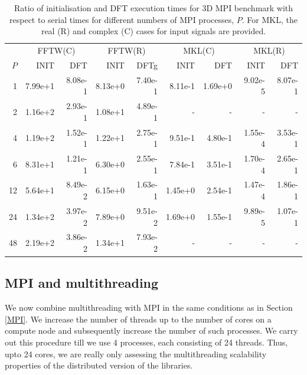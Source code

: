 \documentclass[12pt, a4paper]{article} \setlength{\textheight}{24cm}
\begin{document}
\begin{small}
\begin{table}[H]
  \centering
  \begin{tabular}{|r|rr|rr|rr|rr|}
    \hline
    & \multicolumn{2}{|c|}{FFTW(C)} & \multicolumn{2}{|c|}{FFTW(R)} & \multicolumn{2}{|c|}{MKL(C)} &   \multicolumn{2}{|c|}{MKL(R)}   \\
   $P$ & INIT & DFT & INIT & DFTg & INIT & DFT & INIT & DFT  \\
    \hline
   1 &   7.99e+1 &   8.08e-1 &   8.13e+0 &   7.40e-1 &   8.11e-1 &   1.69e+0 &   9.02e-5 &   8.07e-1 \\
   2 &   1.16e+2 &   2.93e-1 &   1.08e+1 &   4.89e-1 &  - & - & - & - \\
   4 &   1.19e+2 &   1.52e-1 &   1.22e+1 &   2.75e-1 &   9.51e-1 &   4.80e-1 &   1.55e-4 &   3.53e-1 \\
   6 &   8.31e+1 &   1.21e-1 &   6.30e+0 &   2.55e-1 &   7.84e-1 &   3.51e-1 &   1.70e-4 &   2.65e-1 \\
   12 &  5.64e+1 &   8.49e-2 &   6.15e+0 &   1.63e-1 &   1.45e+0 &   2.54e-1 &   1.47e-4 &   1.86e-1 \\
   24 &  1.34e+2 &   3.97e-2 &   7.89e+0 &   9.51e-2 &   1.69e+0 &   1.55e-1 &   9.89e-5 &   1.07e-1 \\
   48 &  2.19e+2 &   3.86e-2 &   1.34e+1 &   7.93e-2 &  - & - & - & - \\
    \hline
  \end{tabular}
  \caption{Ratio of initialisation and DFT execution times for 3D MPI benchmark with respect to serial times for different numbers of MPI processes, $P.$ For MKL, the real (R) and complex (C) cases for input signals are provided.}\label{Tbl:MPI3DScale}
\end{table}
\end{small}



\subsection{MPI and multithreading}\label{MPIMULTH}
We now combine multithreading with MPI in the same conditions as in
Section \ref{MPI}. We increase the number of threads up to the number
of cores on a compute node and subsequently increase the number of
such processes. We carry out this procedure till we use 4 processes,
each consisting of 24 threads. Thus, upto 24 cores, we are really only
assessing the multithreading scalability properties of the distributed
version of the libraries.
\end{document}
